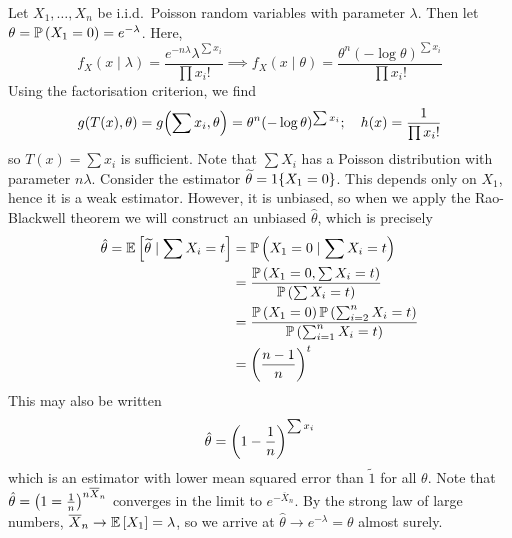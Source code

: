 \begin{example}
	Let \( X_1, \dots, X_n \) be i.i.d.\ Poisson random variables with parameter \( \lambda \).
	Then let \( \theta = \mathbb{P}\left({X_1 = 0}\right) = e^{-\lambda} \).
	Here,
	\[
		f_X(x \mid \lambda) = \frac{e^{-n \lambda} \lambda^{\sum x_i}}{\prod x_i!} \implies f_X(x \mid \theta) = \frac{\theta^n (-\log \theta)^{\sum x_i}}{\prod x_i!}
	\]
	Using the factorisation criterion, we find
	\[
		g(T(x), \theta) = g\qty(\sum x_i, \theta) = \theta^n (-\log\theta)^{\sum x_i};\quad h(x) = \frac{1}{\prod x_i!}
	\]
	so \( T(x) = \sum x_i \) is sufficient.
	Note that \( \sum X_i \) has a Poisson distribution with parameter \( n \lambda \).
	Consider the estimator \( \widetilde \theta = 1\qty{X_1 = 0} \).
	This depends only on \( X_1 \), hence it is a weak estimator.
	However, it is unbiased, so when we apply the Rao-Blackwell theorem we will construct an unbiased \( \hat \theta \), which is precisely
	\begin{align*}
		\hat \theta = \mathbb{E}\left[{\widetilde \theta \mid \sum X_i = t}\right] & = \mathbb{P}\left({X_1 = 0 \mid \sum X_i = t}\right)                                              \\
		                                                           & = \frac{\mathbb{P}\left({X_1 = 0, \sum X_i = t}\right)}{\mathbb{P}\left({\sum X_i = t}\right)}                      \\
		                                                           & = \frac{\mathbb{P}\left({X_1 = 0}\right)\mathbb{P}\left({\sum_{i=2}^n X_i = t}\right)}{\mathbb{P}\left({\sum_{i=1}^n X_i = t}\right)} \\
		                                                           & = \qty(\frac{n-1}{n})^t
	\end{align*}
	This may also be written
	\[
		\hat \theta = \qty(1 - \frac{1}{n})^{\sum x_i}
	\]
	which is an estimator with lower mean squared error than \( \widetilde 1 \) for all \( \theta \).
	Note that \( \hat \theta = \qty(1 = \frac{1}{n})^{n \overline X_n} \) converges in the limit to \( e^{-\overline X_n} \).
	By the strong law of large numbers, \( \overline X_n \to \mathbb{E}\left[{X_1}\right] = \lambda \), so we arrive at \( \hat \theta \to e^{-\lambda} = \theta \) almost surely.
\end{example}

